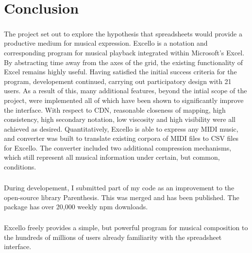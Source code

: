 \chapter{Conclusion}

\paragraph{} The project set out to explore the hypothesis that spreadsheets would provide a productive medium for musical expression. Excello is a notation and corresponding program for musical playback integrated within Microsoft's Excel. By abstracting time away from the axes of the grid, the existing functionality of Excel remains highly useful. Having satisfied the initial success criteria for the program, developement continued, carrying out participatory design with 21 users. As a result of this, many additional features, beyond the intial scope of the project, were implemented all of which have been shown to significantly improve the interface. With respect to CDN, reasonable closeness of mapping, high consistency, high secondary notation, low viscosity and high visibility were all achieved as desired. Quantitatively, Excello is able to express any  MIDI music, and converter was built to translate existing corpora of MIDI files to CSV files for Excello. The converter included two additional compression mechanisms, which still represent all musical information under certain, but common, conditions.

\paragraph{} During developement, I submitted part of my code as an improvement to the open-source library Parenthesis. This was merged and has been published. The package has over 20,000 weekly npm downloads.

\paragraph{} Excello freely provides a simple, but powerful program for musical composition to the hundreds of millions of users already familiarity with the spreadsheet interface.
